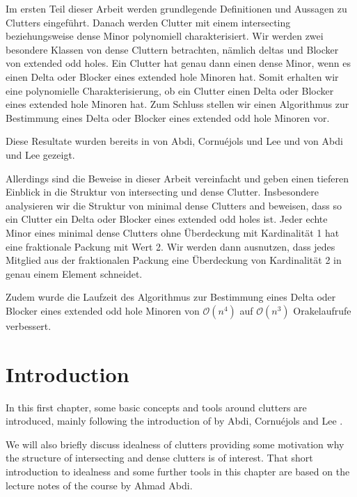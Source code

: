 \documentclass[a4paper, 12pt]{scrbook}
\theoremstyle{definition}
\begin{document}
Im ersten Teil dieser Arbeit werden grundlegende Definitionen und Aussagen zu Clutters eingeführt. Danach werden Clutter mit einem intersecting beziehungsweise dense Minor polynomiell charakterisiert. Wir werden zwei besondere Klassen von dense Cluttern betrachten, nämlich deltas und Blocker von extended odd holes.
Ein Clutter hat genau dann einen dense Minor, wenn es einen Delta oder Blocker eines extended hole Minoren hat.
Somit erhalten wir eine polynomielle Charakterisierung, ob ein Clutter einen Delta oder Blocker eines extended hole Minoren hat.
Zum Schluss stellen wir einen Algorithmus zur Bestimmung eines Delta oder Blocker eines extended odd hole Minoren vor.

Diese Resultate wurden bereits in  von Abdi, Cornuéjols und Lee \cite{restrictions} und  von Abdi und Lee \cite{deltas} gezeigt.

Allerdings sind die Beweise in dieser Arbeit vereinfacht und geben einen tieferen Einblick in die Struktur von intersecting und dense Clutter.
Insbesondere analysieren wir die Struktur von minimal dense Clutters and beweisen, dass so ein Clutter ein Delta oder Blocker eines extended odd holes ist.
Jeder echte Minor eines minimal dense Clutters ohne Überdeckung mit Kardinalität 1 hat eine fraktionale Packung mit Wert 2.
Wir werden dann ausnutzen, dass jedes Mitglied aus der fraktionalen Packung eine Überdeckung von Kardinalität 2 in genau einem Element schneidet.

Zudem wurde die Laufzeit des Algorithmus zur Bestimmung eines Delta oder Blocker eines extended odd hole Minoren von $\mathcal{O}(n^4)$ auf $\mathcal{O}(n^3)$ Orakelaufrufe verbessert.

   \tableofcontents
   \chapter{Introduction}
   In this first chapter, some basic concepts and tools around clutters are introduced, mainly following the introduction of  by Abdi, Cornuéjols and Lee \cite{restrictions}.

   We will also briefly discuss idealness of clutters providing some motivation why the structure of intersecting and dense clutters is of interest. That short introduction to idealness and some further tools in this chapter are based on the lecture notes of the course  by Ahmad Abdi\cite{course}.
\end{document}
